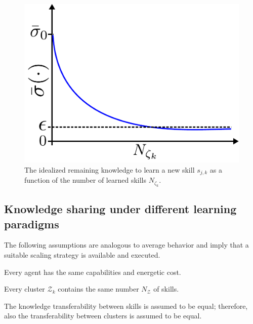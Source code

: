 \begin{figure}[!t]
	\centering
	\includegraphics[width=0.8\columnwidth]{fig/knowledge_idealization.pdf}
	\caption{The idealized remaining knowledge to learn a new skill $s_{j,k}$ as a function of the number of learned skills $N_{\zeta_k}$.}
	\label{fig:knowledge_idealization}
\end{figure}
\subsection{Knowledge sharing under different learning paradigms}
The following assumptions are analogous to average behavior and imply that a suitable scaling strategy is available and executed.
\begin{tcolorbox}
	\begin{assumption}\label{assumption:agent_similarity}
		Every agent has the same capabilities and energetic cost.
	\end{assumption}
\end{tcolorbox}
\begin{tcolorbox}
	\begin{assumption}\label{assumption:cluster_size}
		Every cluster $\mathcal{Z}_{k}$ contains the same number $N_{\mathcal{Z}} $ of skills.
	\end{assumption}
\end{tcolorbox}
\begin{tcolorbox}
	\begin{assumption}\label{assumption:cluster_transferability}
		The knowledge transferability between skills is assumed to be equal; therefore, also the transferability between clusters is assumed to be equal.
	\end{assumption}
\end{tcolorbox}
